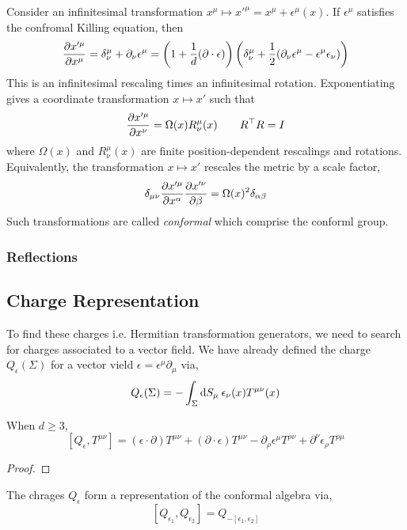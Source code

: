 \documentclass[12pt]{extarticle}
\begin{document}
Consider an infinitesimal transformation $x^\mu \mapsto x'^\mu = x^\mu + \epsilon^\mu(x)$. If $\epsilon^\mu$ satisfies the confromal Killing equation, then
\[ \frac{\partial{x'^\mu}}{\partial{x^\mu}} = \delta^\mu_\nu + \partial_\nu \epsilon^\mu = \left( 1 + \frac{1}{d} (\partial \cdot \epsilon) \right) \left( \delta^\mu_\nu + \frac{1}{2} (\partial_\nu \epsilon^\mu - \epsilon^\mu \epsilon_\nu) \right) \]
This is an infinitesimal rescaling times an infinitesimal rotation. Exponentiating gives a coordinate transformation $x \mapsto x'$ such that
\[ \frac{\partial{x'^\mu}}{\partial{x^\nu}} = \Omega(x) R^\mu_\nu(x) \quad \quad R^\top R = I \]
where $\Omega(x)$ and $R^\mu_\nu(x)$ are finite position-dependent rescalings and rotations. Equivalently, the transformation $x \mapsto x'$ rescales the metric by a scale factor,
\[ \delta_{\mu\nu} \frac{\partial{x'^\mu}}{\partial{x^\alpha}} \frac{\partial{x'^\nu}}{\partial{\beta}} = \Omega(x)^2 \delta_{\alpha \beta} \]
Such transformations are called \textit{conformal} which comprise the conforml group. 

\subsubsection{Reflections}


\subsection{Charge Representation}

To find these charges i.e. Hermitian transformation generators, we need to search for charges associated to a vector field. We have already defined the charge $Q_\epsilon(\Sigma)$ for a vector vield $\epsilon = \epsilon^\mu \partial_\mu$ via,
\[ Q_{\epsilon}(\Sigma) = - \int_{\Sigma} \mathrm{d}S_\mu \: \epsilon_\nu(x) T^{\mu \nu}(x) \]

\begin{theorem}
When $d \ge 3$,
\[ [Q_\epsilon, T^{\mu\nu}] = (\epsilon \cdot \partial) T^{\mu\nu} + (\partial \cdot \epsilon) T^{\mu \nu} - \partial_\rho \epsilon^\mu T^{\rho \nu} + \partial^\nu \epsilon_\rho T^{\rho \mu} \]
\end{theorem}

\begin{proof}

\end{proof}

\begin{theorem}
The chrages $Q_\epsilon$ form a representation of the conformal algebra via,
\[ [Q_{\epsilon_1}, Q_{\epsilon_2}] = Q_{-[\epsilon_1, \epsilon_2]} \]
\end{theorem}
\end{document}
